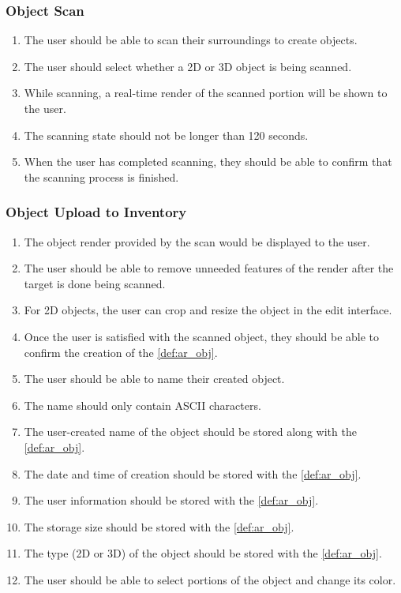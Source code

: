 \documentclass{article}
\begin{document}
\subsubsection{Object Scan}
\label{ssub:obj_scan}
\begin{enumerate}[align=left, label=\textbf{OS-FR\arabic*:}]
    \item The user should be able to scan their surroundings to create objects.
    \item The user should select whether a 2D or 3D object is being scanned.
    \item While scanning, a real-time render of the scanned portion will be shown to the user.
    \item The scanning state should not be longer than 120 seconds.
    \item When the user has completed scanning, they should be able to confirm that the scanning process is finished.
\end{enumerate}

\subsubsection{Object Upload to Inventory}
\label{ssub:obj_upload_inv}
\begin{enumerate}[align=left, label=\textbf{OUI-FR\arabic*:}]
    \item The object render provided by the scan would be displayed to the user.
    \item The user should be able to remove unneeded features of the render after the target is done being scanned.
    \item For 2D objects, the user can crop and resize the object in the edit interface.
    \item Once the user is satisfied with the scanned object, they should be able to confirm the creation of the \ref{def:ar_obj}.
    \item The user should be able to name their created object.
    \item The name should only contain ASCII characters.
    \item The user-created name of the object should be stored along with the \ref{def:ar_obj}.
    \item The date and time of creation should be stored with the \ref{def:ar_obj}.
    \item The user information should be stored with the \ref{def:ar_obj}.
    \item The storage size should be stored with the \ref{def:ar_obj}.
    \item The type (2D or 3D) of the object should be stored with the \ref{def:ar_obj}.
    \item The user should be able to select portions of the object and change its color.
\end{enumerate}
\end{document}
